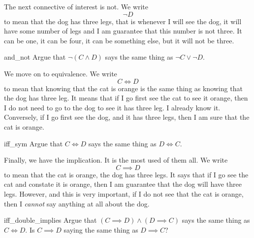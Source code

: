 The next connective of interest is not. We write
\begin{equation*}
    \neg D
\end{equation*}
to mean that the dog has  three legs, that is whenever I will see the dog, it will have some number of legs and I am guarantee that this number is not three. It can be one, it can be four, it can be something else, but it will not be three.

\begin{cex}{}{and_not}
    Argue that \( \neg(C \land D) \) says the same thing as \( \neg C \lor \neg D \).
\end{cex}

We move on to equivalence. We write 
\begin{equation*}
    C \iff D
\end{equation*}
to mean that knowing that the cat is orange is the same thing as knowing that the dog has three leg. It means that if I go first see the cat to see it orange, then I do not need to go to the dog to see it has three leg. I already know it. Conversely, if I go first see the dog, and it has three legs, then I am sure that the cat is orange.

\begin{cex}{}{iff_sym}
    Argue that \( C \iff D \) says the same thing as \( D \iff C \).
\end{cex}

Finally, we have the implication. It is the most used of them all. We write
\begin{equation*}
    C \implies D
\end{equation*}
to mean that  the cat is orange,  the dog has three legs. It says that if I go see the cat and constate it is orange, then I am guarantee that the dog will have three legs. However, and this is very important, if I do not see that the cat is orange, then I \textit{cannot} say anything at all about the dog. 

\begin{cex}{}{iff_double_implies}
    Argue that \( (C \implies D) \land (D \implies C) \) says the same thing as \( C \iff D \). Is \( C \implies D \) saying the same thing as \(  D \implies C \)?
\end{cex}

